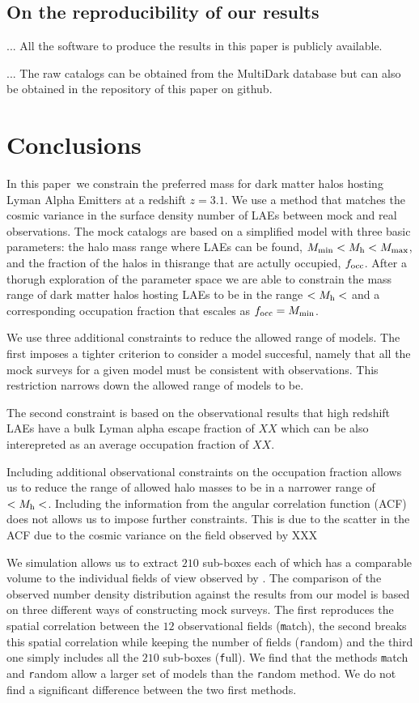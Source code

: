 \documentclass[usenatbib]{mn2e}
\newcommand{\documentname}{paper~}
\begin{document}
\subsection{On the reproducibility of our results}

... All the software to produce the results in this paper is publicly
available. 

... The raw catalogs can be obtained from the MultiDark database but
can also be obtained in the repository of this paper on github.

\section{Conclusions}
In this \documentname we constrain the preferred mass for dark matter
halos hosting Lyman Alpha Emitters at a redshift $z=3.1$. We use a
method that matches the cosmic variance in the surface
density number of LAEs between mock and real observations. The mock
catalogs are based on a simplified model with three basic parameters: the halo
mass range where LAEs can be found, $M_{\rm   min}<M_{\rm h}<M_{\rm
  max}$, and the fraction of the halos in thisrange that are actully
occupied, $f_{\rm occ}$. After a thorugh exploration of the parameter
space we are able to constrain the mass range of dark matter halos
hosting LAEs to be in the range $<M_{\rm   h}<$ and a corresponding
occupation fraction that escales as $f_{\rm   occ} = M_{\rm min}$. 

We use three additional constraints to reduce the allowed
range of models. The first imposes a tighter criterion to consider a
model succesful, namely that all the mock surveys for a given model
must be consistent with observations. This restriction narrows down
the allowed range of models to be. 

The second constraint is based on the observational results that high
redshift LAEs have a bulk Lyman alpha escape fraction of $XX$ which
can be also interepreted as an average occupation fraction of $XX$.

Including additional observational constraints on the occupation
fraction allows us to reduce the range of allowed halo masses to be in
a narrower range of $<M_{\rm h}<$. Including the information from the
angular correlation function (ACF) does not allows us to impose
further constraints. This is due to the scatter in the ACF due to the
cosmic variance on the field observed by XXX


We simulation allows us to extract $210$ sub-boxes each of which has a
comparable volume to the individual fields of view observed by
\cite{Yamada2012}. The comparison of the observed number density
distribution against the results from our model is based on three
different ways of constructing mock surveys. The first reproduces the
spatial correlation between the $12$ observational fields ({\texttt
  match}), the second breaks this spatial correlation while keeping
the number of fields ({\texttt random}) and the third one simply
includes all the $210$ sub-boxes ({\texttt full}). We find that the
methods {\texttt match} and {\texttt random} allow a larger set of
models than the {{\texttt random}} method. We do not find a
significant difference between the two first methods. 
\end{document}
